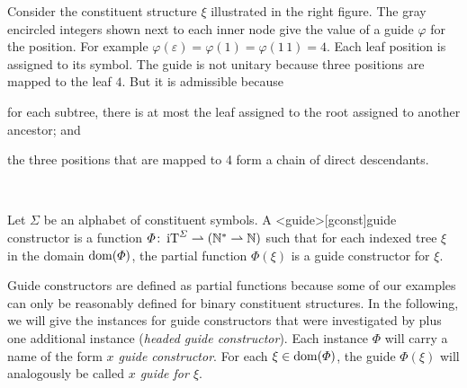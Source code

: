 \documentclass[../../document.tex]{subfiles}
\begin{document}
    \bigskip

    \begin{wrapfigure}[6]{r}{.3\linewidth}
        
    \end{wrapfigure}
    \parexample*
    Consider the constituent structure \(\xi\) illustrated in the right figure.
    The gray encircled integers shown next to each inner node give the value of a guide \(\varphi\) for the position.
    For example \(\varphi(\varepsilon) = \varphi(1) = \varphi(1\,1) = 4\).
    Each leaf position is assigned to its symbol.
    The guide is not unitary because three positions are mapped to the leaf $4$.
    But it is admissible because
    \begin{inparaenum}
        \item for each subtree, there is at most the leaf assigned to the root assigned to another ancestor; and
        \item the three positions that are mapped to 4 form a chain of direct descendants.
    \end{inparaenum}
    \\\null\exampleqed

    \begin{definition}
        Let \(\varSigma\) be an alphabet of constituent symbols.
        A <guide>[gconst]{guide constructor} is a function \(\varPhi\colon \operatorname{iT}^\varSigma \rightharpoonup (\mathbb{N}^* \rightharpoonup \mathbb{N})\) such that for each indexed tree \(\xi\) in the domain \(\operatorname{dom}(\varPhi)\), the partial function \(\varPhi(\xi)\) is a guide constructor for \(\xi\).
    \end{definition}

    Guide constructors are defined as partial functions because some of our examples can only be reasonably defined for binary constituent structures.
    In the following, we will give the instances for guide constructors that were investigated by \citet{Rup22} plus one additional instance (\emph{headed guide constructor}).
    Each instance \(\varPhi\) will carry a name of the form \emph{\(x\) guide constructor}.
    For each \(\xi \in \operatorname{dom}(\varPhi)\), the guide \(\varPhi(\xi)\) will analogously be called \emph{\(x\) guide for \(\xi\)}.
\end{document}
